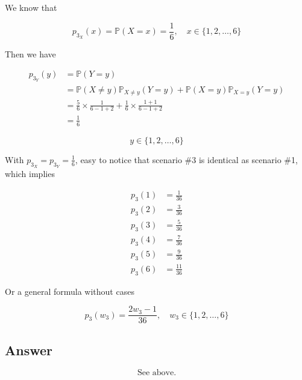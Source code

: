 \documentclass[12pt]{article}
\newcommand{\bP}{\mathbb{P}}
\begin{document}
\begin{enumerate}[start=1,label={\bfseries Part \arabic*:},leftmargin=0in]
			We know that
			
			\[p_{3_X}(x) = \bP(X = x) = \frac{1}{6},\quad x\in\{1,2,\dots,6\}\]
			
			Then we have
			
			\[
			\begin{aligned}
				p_{3_Y}(y) &= \bP(Y = y)\\
				&= \bP(X \ne y)\bP_{X \ne y}(Y = y) + \bP(X = y)\bP_{X = y}(Y = y)\\
				&= \frac{5}{6}\times \frac{1}{6-1+2} + \frac{1}{6}\times \frac{1+1}{6-1+2}\\
				&= \frac{1}{6}
			\end{aligned}
			\]
			
			\[y\in\{1,2,\dots,6\}\]
			
			With $p_{3_X} = p_{3_Y} = \frac{1}{6}$, easy to notice that scenario \#3 is identical as scenario \#1, which implies
			
			\[
			\begin{aligned}
				p_3(1) &= \frac{1}{36}\\
				p_3(2) &= \frac{3}{36}\\
				p_3(3) &= \frac{5}{36}\\
				p_3(4) &= \frac{7}{36}\\
				p_3(5) &= \frac{9}{36}\\
				p_3(6) &= \frac{11}{36}
			\end{aligned}
			\]
			
			Or a general formula without cases
			
			\[p_3(w_3) = \frac{2w_3-1}{36},\quad w_3\in \{1,2,\dots,6\}\]
		
		\subsection*{Answer}
		
			\[\boxed{\text{See above.}}\]
	\end{enumerate}
	
\end{document}
